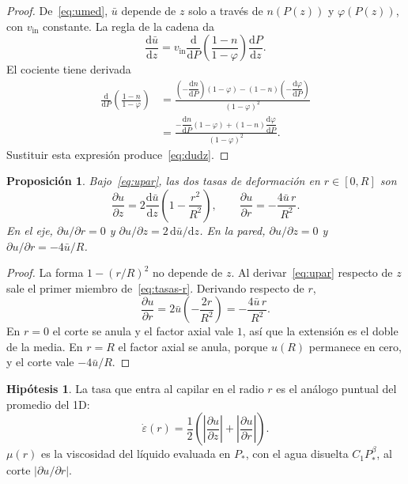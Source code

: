 \documentclass[11pt,a4paper]{article}
\theoremstyle{plain}
\newtheorem{proposicion}{Proposición}
\theoremstyle{definition}
\newtheorem{hipotesis}{Hipótesis}
\theoremstyle{remark}
\begin{document}
\begin{proof}
De~\eqref{eq:umed}, \(\bar u\) depende de \(z\) solo a través de
\(n(P(z))\) y \(\varphi(P(z))\), con \(v_{\mathrm{in}}\) constante.
La regla de la cadena da
\begin{equation}
\frac{\mathrm{d}\bar u}{\mathrm{d}z}
=
v_{\mathrm{in}}
\frac{\mathrm{d}}{\mathrm{d}P}
\left(\frac{1-n}{1-\varphi}\right)
\frac{\mathrm{d}P}{\mathrm{d}z}.
\end{equation}
El cociente tiene derivada
\begin{align}
\frac{\mathrm{d}}{\mathrm{d}P}
\left(\frac{1-n}{1-\varphi}\right)
&=
\frac{
\left(-\dfrac{\mathrm{d}n}{\mathrm{d}P}\right)(1-\varphi)
-
(1-n)\left(-\dfrac{\mathrm{d}\varphi}{\mathrm{d}P}\right)
}{(1-\varphi)^2}
\nonumber\\
&=
\frac{
-\dfrac{\mathrm{d}n}{\mathrm{d}P}(1-\varphi)
+(1-n)\dfrac{\mathrm{d}\varphi}{\mathrm{d}P}
}{(1-\varphi)^2}.
\end{align}
Sustituir esta expresión produce~\eqref{eq:dudz}.
\end{proof}

\begin{proposicion}
\label{prop:tasas}
Bajo~\eqref{eq:upar}, las dos tasas de deformación en \(r\in[0,R]\) son
\begin{equation}
\frac{\partial u}{\partial z}
=
2\frac{\mathrm{d}\bar u}{\mathrm{d}z}
\left(1-\frac{r^2}{R^2}\right),
\qquad
\frac{\partial u}{\partial r}
=
-\frac{4\bar u\, r}{R^2}.
\label{eq:tasas-r}
\end{equation}
En el eje, \(\partial u/\partial r=0\) y
\(\partial u/\partial z=2\,\mathrm{d}\bar u/\mathrm{d}z\).
En la pared, \(\partial u/\partial z=0\) y
\(\partial u/\partial r=-4\bar u/R\).
\end{proposicion}

\begin{proof}
La forma \(1-(r/R)^2\) no depende de \(z\). Al derivar~\eqref{eq:upar}
respecto de \(z\) sale el primer miembro de~\eqref{eq:tasas-r}.
Derivando respecto de \(r\),
\begin{equation}
\frac{\partial u}{\partial r}
=
2\bar u\left(-\frac{2r}{R^2}\right)
=
-\frac{4\bar u\, r}{R^2}.
\end{equation}
En \(r=0\) el corte se anula y el factor axial vale \(1\), así que la
extensión es el doble de la media. En \(r=R\) el factor axial se anula,
porque \(u(R)\) permanece en cero, y el corte vale \(-4\bar u/R\).
\end{proof}

\begin{hipotesis}
\label{hip:tasa}
La tasa que entra al capilar en el radio \(r\) es el análogo puntual del
promedio del 1D:
\begin{equation}
\dot\varepsilon(r)
=
\frac12
\left(
\left|\frac{\partial u}{\partial z}\right|
+
\left|\frac{\partial u}{\partial r}\right|
\right).
\label{eq:edot}
\end{equation}
\(\mu(r)\) es la viscosidad del líquido evaluada en \(P_\ast\), con el agua
disuelta \(C_1 P_\ast^{\beta}\), al corte \(|\partial u/\partial r|\).
\end{hipotesis}
\end{document}
